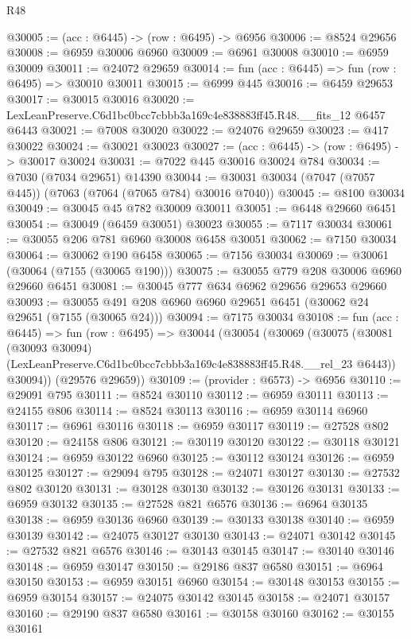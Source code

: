 \begin{lexlean}{R48}
\begin{coremodule}
@30005 := (acc : @6445) -> (row : @6495) -> @6956
@30006 := @8524 @29656
@30008 := @6959 @30006 @6960
@30009 := @6961 @30008
@30010 := @6959 @30009
@30011 := @24072 @29659
@30014 := fun (acc : @6445) => fun (row : @6495) => @30010 @30011
@30015 := @6999 @445
@30016 := @6459 @29653
@30017 := @30015 @30016
@30020 := LexLeanPreserve.C6d1bc0bcc7cbbb3a169c4e838883ff45.R48.__fits_12 @6457 @6443
@30021 := @7008 @30020
@30022 := @24076 @29659
@30023 := @417 @30022
@30024 := @30021 @30023
@30027 := (acc : @6445) -> (row : @6495) -> @30017 @30024
@30031 := @7022 @445 @30016 @30024 @784
@30034 := @7030 (@7034 @29651) @14390
@30044 := @30031 @30034 (@7047 (@7057 @445)) (@7063 (@7064 (@7065 @784) @30016 @7040))
@30045 := @8100 @30034
@30049 := @30045 @45 @782 @30009 @30011
@30051 := @6448 @29660 @6451
@30054 := @30049 (@6459 @30051) @30023
@30055 := @7117 @30034
@30061 := @30055 @206 @781 @6960 @30008 @6458 @30051
@30062 := @7150 @30034
@30064 := @30062 @190 @6458
@30065 := @7156 @30034
@30069 := @30061 (@30064 (@7155 (@30065 @190)))
@30075 := @30055 @779 @208 @30006 @6960 @29660 @6451
@30081 := @30045 @777 @634 @6962 @29656 @29653 @29660
@30093 := @30055 @491 @208 @6960 @6960 @29651 @6451 (@30062 @24 @29651 (@7155 (@30065 @24)))
@30094 := @7175 @30034
@30108 := fun (acc : @6445) =>
  fun (row : @6495) =>
  @30044
    (@30054
      (@30069
        (@30075
          (@30081
            (@30093 @30094)
            (LexLeanPreserve.C6d1bc0bcc7cbbb3a169c4e838883ff45.R48.__rel_23 @6443))
          @30094))
      (@29576 @29659))
@30109 := (provider : @6573) -> @6956
@30110 := @29091 @795
@30111 := @8524 @30110
@30112 := @6959 @30111
@30113 := @24155 @806
@30114 := @8524 @30113
@30116 := @6959 @30114 @6960
@30117 := @6961 @30116
@30118 := @6959 @30117
@30119 := @27528 @802
@30120 := @24158 @806
@30121 := @30119 @30120
@30122 := @30118 @30121
@30124 := @6959 @30122 @6960
@30125 := @30112 @30124
@30126 := @6959 @30125
@30127 := @29094 @795
@30128 := @24071 @30127
@30130 := @27532 @802 @30120
@30131 := @30128 @30130
@30132 := @30126 @30131
@30133 := @6959 @30132
@30135 := @27528 @821 @6576
@30136 := @6964 @30135
@30138 := @6959 @30136 @6960
@30139 := @30133 @30138
@30140 := @6959 @30139
@30142 := @24075 @30127 @30130
@30143 := @24071 @30142
@30145 := @27532 @821 @6576
@30146 := @30143 @30145
@30147 := @30140 @30146
@30148 := @6959 @30147
@30150 := @29186 @837 @6580
@30151 := @6964 @30150
@30153 := @6959 @30151 @6960
@30154 := @30148 @30153
@30155 := @6959 @30154
@30157 := @24075 @30142 @30145
@30158 := @24071 @30157
@30160 := @29190 @837 @6580
@30161 := @30158 @30160
@30162 := @30155 @30161

\end{coremodule}
\end{lexlean}
